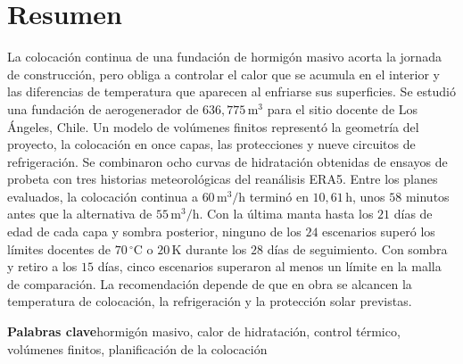 \section*{Resumen}
La colocación continua de una fundación de hormigón masivo acorta la jornada de construcción, pero obliga a controlar el calor que se acumula en el interior y las diferencias de temperatura que aparecen al enfriarse sus superficies. Se estudió una fundación de aerogenerador de $636{,}775\,\mathrm{m^3}$ para el sitio docente de Los Ángeles, Chile. Un modelo de volúmenes finitos representó la geometría del proyecto, la colocación en once capas, las protecciones y nueve circuitos de refrigeración. Se combinaron ocho curvas de hidratación obtenidas de ensayos de probeta con tres historias meteorológicas del reanálisis ERA5. Entre los planes evaluados, la colocación continua a $60\,\mathrm{m^3/h}$ terminó en $10{,}61\,\mathrm h$, unos $58$ minutos antes que la alternativa de $55\,\mathrm{m^3/h}$. Con la última manta hasta los $21$ días de edad de cada capa y sombra posterior, ninguno de los $24$ escenarios superó los límites docentes de $70\,^\circ\mathrm C$ o $20\,\mathrm K$ durante los $28$ días de seguimiento. Con sombra y retiro a los $15$ días, cinco escenarios superaron al menos un límite en la malla de comparación. La recomendación depende de que en obra se alcancen la temperatura de colocación, la refrigeración y la protección solar previstas.

\textbf{Palabras clave}\quad hormigón masivo, calor de hidratación, control térmico, volúmenes finitos, planificación de la colocación

